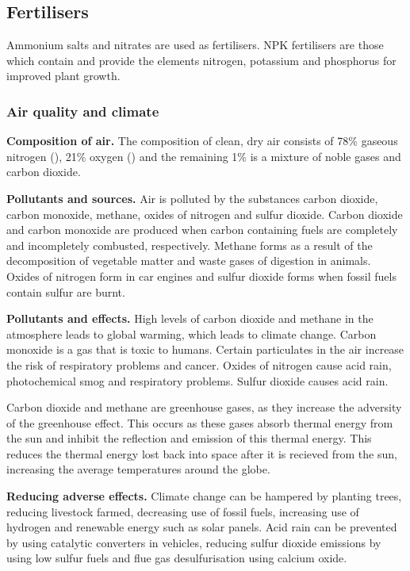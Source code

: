 \subsection{Fertilisers}

Ammonium salts and nitrates are used as fertilisers. NPK fertilisers are those which contain and
provide the elements nitrogen, potassium and phosphorus for improved plant growth.

\subsubsection{Air quality and climate}

\textbf{Composition of air.} The composition of clean, dry air consists of 78\% gaseous nitrogen
(), 21\% oxygen () and the remaining 1\% is a mixture of noble gases and carbon 
dioxide.

\textbf{Pollutants and sources.} Air is polluted by the substances carbon dioxide, carbon monoxide, methane,
oxides of nitrogen and sulfur dioxide. Carbon dioxide and carbon monoxide are produced when 
carbon containing fuels are completely and incompletely combusted, respectively. Methane forms as
a result of the decomposition of vegetable matter and waste gases of digestion in animals. Oxides
of nitrogen form in car engines and sulfur dioxide forms when fossil fuels contain sulfur are 
burnt.

\textbf{Pollutants and effects.} High levels of carbon dioxide and methane in the atmosphere leads 
to global warming, which leads to climate change. Carbon monoxide is a gas that is toxic to humans.
Certain particulates in the air increase the risk of respiratory problems and cancer. Oxides of
nitrogen cause acid rain, photochemical smog and respiratory problems. Sulfur dioxide causes
acid rain.

Carbon dioxide and methane are greenhouse gases, as they increase the adversity of the greenhouse
effect. This occurs as these gases absorb thermal energy from the sun and inhibit the reflection
and emission of this thermal energy. This reduces the thermal energy lost back into space after
it is recieved from the sun, increasing the average temperatures around the globe.

\textbf{Reducing adverse effects.} Climate change can be hampered by planting trees, reducing
livestock farmed, decreasing use of fossil fuels, increasing use of hydrogen and renewable energy
such as solar panels. Acid rain can be prevented by using catalytic converters in vehicles, 
reducing sulfur dioxide emissions by using low sulfur fuels and flue gas desulfurisation using
calcium oxide.

